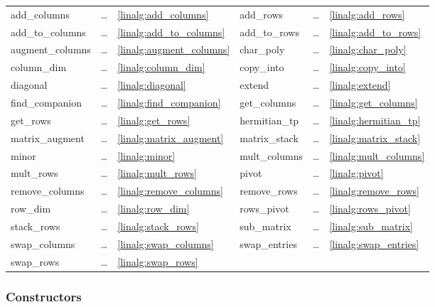 {\begin{center}
  \begin{tabular}{l l l l l l}
    add\_columns     & \ldots & \ref{linalg:add_columns}  &
    add\_rows        & \ldots & \ref{linalg:add_rows}  \\
    add\_to\_columns & \ldots & \ref{linalg:add_to_columns}  &
    add\_to\_rows    & \ldots & \ref{linalg:add_to_rows}  \\
    augment\_columns & \ldots & \ref{linalg:augment_columns}  &
    char\_poly       & \ldots & \ref{linalg:char_poly}  \\
    column\_dim      & \ldots & \ref{linalg:column_dim}  &
    copy\_into       & \ldots & \ref{linalg:copy_into} \\
    diagonal         & \ldots & \ref{linalg:diagonal} &
    extend           & \ldots & \ref{linalg:extend} \\
    find\_companion  & \ldots & \ref{linalg:find_companion}  &
    get\_columns     & \ldots & \ref{linalg:get_columns} \\
    get\_rows        & \ldots & \ref{linalg:get_rows} &
    hermitian\_tp    & \ldots & \ref{linalg:hermitian_tp} \\
    matrix\_augment  & \ldots & \ref{linalg:matrix_augment} &
    matrix\_stack    & \ldots & \ref{linalg:matrix_stack} \\
    minor            & \ldots & \ref{linalg:minor} &
    mult\_columns    & \ldots & \ref{linalg:mult_columns} \\
    mult\_rows       & \ldots & \ref{linalg:mult_rows} &
    pivot            & \ldots & \ref{linalg:pivot} \\
    remove\_columns  & \ldots & \ref{linalg:remove_columns} &
    remove\_rows     & \ldots & \ref{linalg:remove_rows} \\
    row\_dim         & \ldots & \ref{linalg:row_dim} &
    rows\_pivot      & \ldots & \ref{linalg:rows_pivot} \\
    stack\_rows      & \ldots & \ref{linalg:stack_rows} &
    sub\_matrix      & \ldots & \ref{linalg:sub_matrix} \\
    swap\_columns    & \ldots & \ref{linalg:swap_columns} &
    swap\_entries    & \ldots & \ref{linalg:swap_entries} \\
    swap\_rows       & \ldots & \ref{linalg:swap_rows} &
  \end{tabular}
\end{center}


\subsubsection{Constructors}

}
